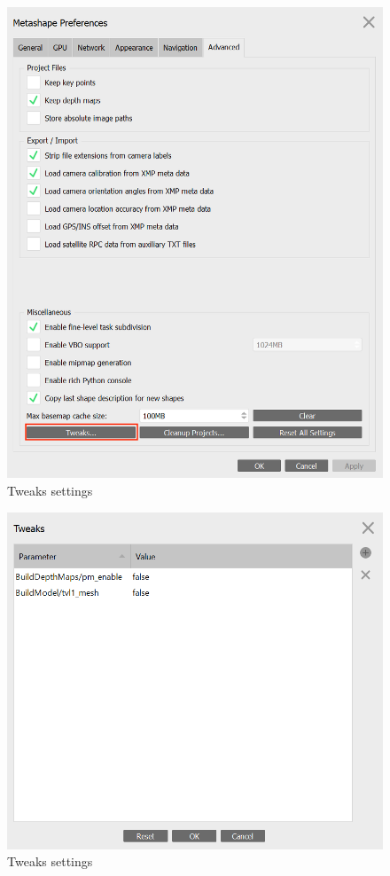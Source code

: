\documentclass[
]{book}
\begin{document}
\begin{figure}

{\centering \includegraphics[width=0.8\linewidth]{Figures/Metashape_tweaks_1} 

}

\caption{Tweaks settings}\label{fig:metashapetweaks1}
\end{figure}

\begin{figure}

{\centering \includegraphics[width=0.8\linewidth]{Figures/Metashape_tweaks_2} 

}

\caption{Tweaks settings}\label{fig:metashapetweaks2}
\end{figure}
\end{document}

